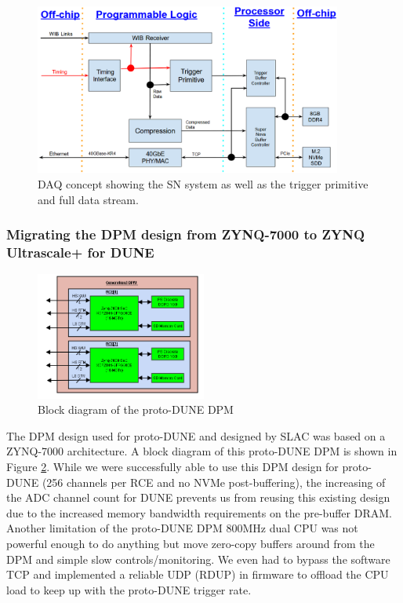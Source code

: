 \begin{figure}[tb]
\centering
\includegraphics[width=0.9\textwidth]{images/FW_block_diagram.png}
\caption{\label{fig:FW_block_diagram}DAQ concept showing the SN system as well as the trigger primitive and full data stream.}
\end{figure}

\subsubsection{Migrating the DPM design from ZYNQ-7000 to ZYNQ Ultrascale+ for DUNE}

\begin{figure}[tb]
\centering
\includegraphics[width=0.5\textwidth]{images/proto-dune-dpm.png}
\caption{\label{fig:proto-dune-dpm} Block diagram of the proto-DUNE DPM}
\end{figure}

The DPM design used for proto-DUNE and designed by SLAC was based on a ZYNQ-7000 architecture. A block diagram of this proto-DUNE DPM is shown in Figure \ref{fig:proto-dune-dpm}.  While we were successfully able to use this DPM design for proto-DUNE (256 channels per RCE and no NVMe post-buffering), the increasing of the ADC channel count for DUNE prevents us from reusing this existing design due to the increased memory bandwidth requirements on the pre-buffer DRAM.  Another limitation of the proto-DUNE DPM 800MHz dual CPU was not powerful enough to do anything but move zero-copy buffers around from the DPM and simple slow controls/monitoring. We even had to bypass the software TCP and implemented a reliable UDP (RDUP) in firmware to offload the CPU load to keep up with the proto-DUNE trigger rate.  

